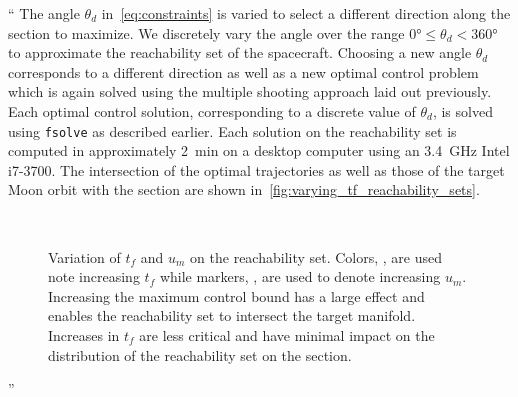 \documentclass[11pt]{article}
\newenvironment{correction}{\begin{list}{}{\setlength{\leftmargin}{1cm}\setlength{\rightmargin}{1cm}}\vspace{\parsep}\item[]``}{''\end{list}}
\begin{document}
\begin{itemize}
\begin{correction}
            The angle \( \theta_d\) in~\cref{eq:constraints} is varied to select a different direction along the \Poincare section to maximize.
            We discretely vary the angle over the range \( \ang{0} \leq \theta_d < \ang{360} \) to approximate the reachability set of the spacecraft.
            Choosing a new angle \( \theta_d \) corresponds to a different direction as well as a new optimal control problem which is again solved using the multiple shooting approach laid out previously.
            Each optimal control solution, corresponding to a discrete value of \( \theta_d \), is solved using \texttt{fsolve} as described earlier. 
            Each solution on the reachability set is computed in approximately \SI{2}{\minute} on a desktop computer using an \SI{3.4}{\giga\hertz} Intel i7-3700.
            The intersection of the optimal trajectories as well as those of the target Moon orbit with the \Poincare section are shown in~\cref{fig:varying_tf_reachability_sets}.

            \begin{figure}
                ~
                \caption{Variation of \( t_f \) and \( u_m\) on the reachability set. 
                    Colors, , are used note increasing \( t_f\) while markers, , are used to denote increasing \(u_m\).
                    Increasing the maximum control bound has a large effect and enables the reachability set to intersect the target manifold. 
                Increases in \(t_f\) are less critical and have minimal impact on the distribution of the reachability set on the \Poincare section.}
            \end{figure}


\end{correction}
\end{itemize}
\end{document}
